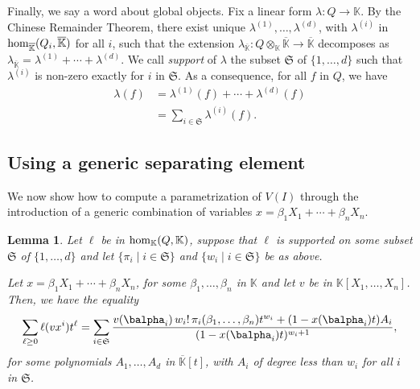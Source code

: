 \documentclass[12pt]{article}
\def\K {\ensuremath{\mathbb{K}}}
\def\Kbar {{\ensuremath{\overline{\mathbb{K}}}}}
\newtheorem{lemma}[definition]{Lemma}
\def\K{\mathbb{K}}
\begin{document}
Finally, we say a word about global objects.  Fix a linear form $\lambda:
Q \to \K$. By the Chinese Remainder Theorem, there exist unique
$\lambda^{(1)},\dots,\lambda^{(d)}$, with $\lambda^{(i)}$ in ${\rm
	hom}_\Kbar(Q_i,\Kbar)$ for all $i$, such that the extension
$\lambda_\Kbar: Q\otimes_\K \Kbar \to \Kbar$ decomposes as $\lambda_\Kbar =
\lambda^{(1)} + \cdots + \lambda^{(d)}$. We call {\em support} of $\lambda$ the
subset $\mathfrak{S}$ of $\{1,\dots,d\}$ such that $\lambda^{(i)}$ is
non-zero exactly for $i$ in $\mathfrak{S}$.  As a consequence, for all
$f$ in $Q$, we have
\begin{align}\label{eq:fui}
\lambda(f) &= \lambda^{(1)}(f) + \cdots + \lambda^{(d)}(f)\nonumber\\
&=  \sum_{i \in \mathfrak{S}} \lambda^{(i)}(f).
\end{align}

\subsection{Using a generic separating element}
We now show
how to compute a parametrization of $V(I)$ through the introduction
of a generic combination of variables $x=\beta_1 X_1 + \cdots +\beta_n X_n$.

\begin{lemma}\label{lemma:formula}
	Let $\ell$ be in ${\rm hom}_\K(Q,\K)$, suppose that $\ell$ is supported on
	some subset 
	$\mathfrak{S}$ of $\{1,\dots,d\}$ and let $\{\pi_i \mid i \in \mathfrak{S}\}$
	and  $\{w_i \mid i \in \mathfrak{S}\}$
	be as above. 
	
	Let $x=\beta_1 X_1 + \cdots +\beta_n X_n$, for some $\beta_1,\dots,\beta_n$ in $\K$
	and let $v$ be in $\K[X_1,\dots,X_n]$. Then, we have the equality
	\begin{align}\label{eq:sumgenseries}
	\sum_{\ell \ge 0} \ell(v x^i)t^\ell =
	\sum_{i \in \mathfrak{S}} \frac{
		v(\balpha_i)\, w_i!\, \pi_{i}(\beta_1,\dots,\beta_n)
		t^{w_i} + (1-x(\balpha_i)    t)A_i}
	{(1-x(\balpha_i) t)^{w_{i}+1}},    
	\end{align}
	for some polynomials $A_1,\dots,A_d$ in
	$\Kbar[t]$, with $A_i$ of degree less than $w_i$ for all $i$
	in $\mathfrak{S}$.
\end{lemma}
\end{document}

